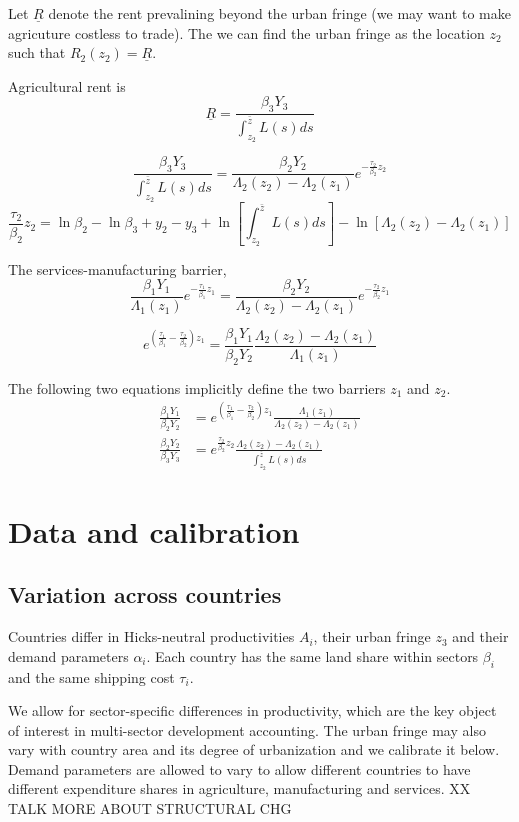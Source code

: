 \documentclass[12pt]{article}
\begin{document}
Let $\underline R$ denote the rent prevalining beyond the urban fringe (we may want to make agricuture costless to trade). The we can find the urban fringe as the location $z_2$ such that $R_2(z_2)=\underline R$.

Agricultural rent is
\[
\underline R = \frac{\beta_3 Y_3}{\int_{z_2}^{\bar z}L(s)ds} 
\]

\[
 \frac{\beta_3 Y_3}{\int_{z_2}^{\bar z}L(s)ds} =
 \frac{\beta_2 Y_2}{\Lambda_2(z_2)-\Lambda_2(z_1)} e^{-\frac{\tau_{2}}{\beta_{2}} z_2}
\]
\[
\frac{\tau_2}{\beta_2}z_2 =
\ln\beta_2-\ln\beta_3 +y_2-y_3+\ln\left[\int_{z_2}^{\bar z}L(s)ds\right]
-\ln[\Lambda_2(z_2)-\Lambda_2(z_1)]
\]

The services-manufacturing barrier,
\[
 \frac{\beta_1 Y_1}{\Lambda_1(z_1)} e^{-\frac{\tau_{1}}{\beta_{1}} z_1} =
 \frac{\beta_2 Y_2}{\Lambda_2(z_2)-\Lambda_2(z_1)} e^{-\frac{\tau_{2}}{\beta_{2}} z_1}
\]

\[
e^{\left(\frac{\tau_{1}}{\beta_{1}}-\frac{\tau_{2}}{\beta_{2}}\right) z_1}
= 
 \frac{\beta_1 Y_1}{\beta_2 Y_2}  
 \frac{\Lambda_2(z_2)-\Lambda_2(z_1)}{\Lambda_1(z_1)} 
\]

The following two equations implicitly define the two barriers $z_1$ and $z_2$.
\begin{align}
 \frac{\beta_1 Y_1}{\beta_2 Y_2}  
 &=
 e^{\left(\frac{\tau_{1}}{\beta_{1}}-\frac{\tau_{2}}{\beta_{2}}\right) z_1}
 \frac{\Lambda_1(z_1)}{\Lambda_2(z_2)-\Lambda_2(z_1)} 
\\
 \frac{\beta_2 Y_2}  {\beta_3 Y_3}
 &=
 e^{\frac{\tau_{2}}{\beta_{2}} z_2}
 \frac{\Lambda_2(z_2)-\Lambda_2(z_1)} {\int_{z_2}^{\bar z}L(s)ds}
\end{align}


\section{Data and calibration}

\subsection{Variation across countries}
Countries differ in Hicks-neutral productivities $A_i$, their urban fringe $z_3$ and their demand parameters $\alpha_i$. Each country has the same land share within sectors $\beta_i$ and the same shipping cost $\tau_i$.

We allow for sector-specific differences in productivity, which are the key object of interest in multi-sector development accounting. The urban fringe may also vary with country area and its degree of urbanization and we calibrate it below. Demand parameters are allowed to vary to allow different countries to have different expenditure shares in agriculture, manufacturing and services. XX TALK MORE ABOUT STRUCTURAL CHG
\end{document}
